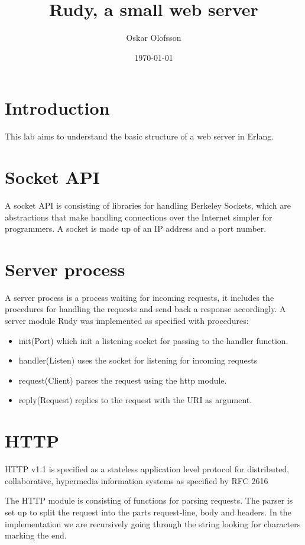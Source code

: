 \documentclass[a4paper]{article}
\title{Rudy, a small web server}
\author{Oskar Olofsson}
\date{\today}
\begin{document}
\maketitle

\section{Introduction}
This lab aims to understand the basic structure of a web server in Erlang.

\section{Socket API}
A socket API is consisting of libraries for handling Berkeley Sockets, which are abstractions that make handling connections over the Internet simpler for programmers. A socket is made up of an IP address and a port number.

\section{Server process}
A server process is a process waiting for incoming requests, it includes the procedures for handling the requests and send back a response accordingly. A server module Rudy was implemented as specified with procedures:

\begin{itemize}
\item init(Port) which init a listening socket for passing to the handler function.
\item handler(Listen) uses the socket for listening for incoming requests
\item request(Client) parses the request using the http module.
\item reply(Request) replies to the request with the URI as argument.
\end{itemize}

\section{HTTP}
HTTP v1.1 is specified as a stateless application level protocol for distributed, collaborative, hypermedia information systems as specified by RFC 2616

The HTTP module is consisting of functions for parsing requests. The parser is set up to split the request into the parts request-line, body and headers. In the implementation we are recursively going through the string looking for characters marking the end.
\end{document}

